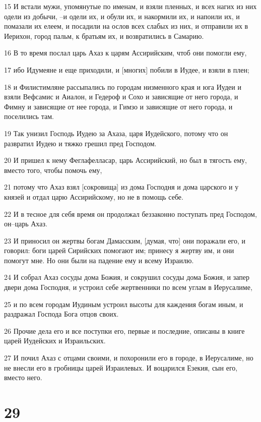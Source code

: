 \par 15 И встали мужи, упомянутые по именам, и взяли пленных, и всех нагих из них одели из добычи, --и одели их, и обули их, и накормили их, и напоили их, и помазали их елеем, и посадили на ослов всех слабых из них, и отправили их в Иерихон, город пальм, к братьям их, и возвратились в Самарию.
\par 16 В то время послал царь Ахаз к царям Ассирийским, чтоб они помогли ему,
\par 17 ибо Идумеяне и еще приходили, и [многих] побили в Иудее, и взяли в плен;
\par 18 и Филистимляне рассыпались по городам низменного края и юга Иудеи и взяли Вефсамис и Аиалон, и Гедероф и Сохо и зависящие от него города, и Фимну и зависящие от нее города, и Гимзо и зависящие от него города, и поселились там.
\par 19 Так унизил Господь Иудею за Ахаза, царя Иудейского, потому что он развратил Иудею и тяжко грешил пред Господом.
\par 20 И пришел к нему Феглафелласар, царь Ассирийский, но был в тягость ему, вместо того, чтобы помочь ему,
\par 21 потому что Ахаз взял [сокровища] из дома Господня и дома царского и у князей и отдал царю Ассирийскому, но не в помощь себе.
\par 22 И в тесное для себя время он продолжал беззаконно поступать пред Господом, он--царь Ахаз.
\par 23 И приносил он жертвы богам Дамасским, [думая, что] они поражали его, и говорил: боги царей Сирийских помогают им; принесу я жертву им, и они помогут мне. Но они были на падение ему и всему Израилю.
\par 24 И собрал Ахаз сосуды дома Божия, и сокрушил сосуды дома Божия, и запер двери дома Господня, и устроил себе жертвенники по всем углам в Иерусалиме,
\par 25 и по всем городам Иудиным устроил высоты для каждения богам иным, и раздражал Господа Бога отцов своих.
\par 26 Прочие дела его и все поступки его, первые и последние, описаны в книге царей Иудейских и Израильских.
\par 27 И почил Ахаз с отцами своими, и похоронили его в городе, в Иерусалиме, но не внесли его в гробницы царей Израилевых. И воцарился Езекия, сын его, вместо него.

\chapter{29}

